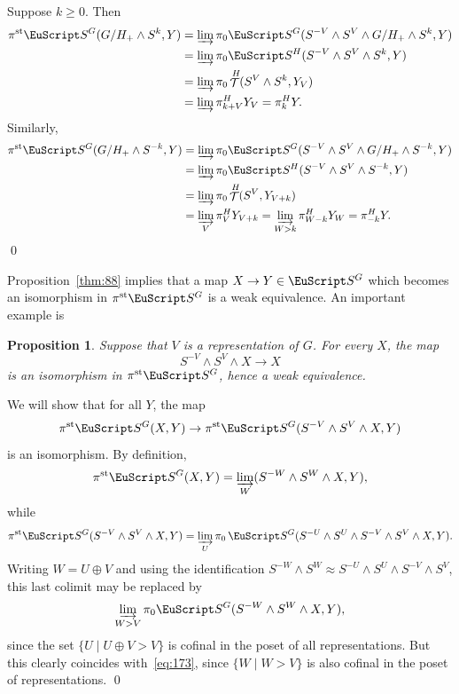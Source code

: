 \documentclass{amsart}
\newtheorem{prop}[equation]{Proposition}
\theoremstyle{definition}
\theoremstyle{remark}
\newenvironment{pf}{\bigskip{\em Proof:\/}}{\qed\medskip}
\newcommand{\spectra}{\EuScript S}
\DeclareMathOperator{\spaces}{\mathcal T}
\newcommand{\ugspaces}[1]{\spaces^{#1}}
\newcommand{\ugspectra}[1]{\spectra^{#1}}
\newcommand{\pist}{\pi^{\text{st}}}
\begin{document}
\begin{pf}
Suppose $k\ge 0$.   Then
\begin{align*}
\pist\ugspectra{G}(G/H_{+}\wedge S^{k},Y) &= \varinjlim \pi_{0}\ugspectra{G}(S^{-V}\wedge
S^{V}\wedge G/H_{+}\wedge S^{k},Y) \\
& = \varinjlim \pi_{0}\ugspectra{H}(S^{-V}\wedge
S^{V}\wedge S^{k},Y) \\
&= \varinjlim \pi_{0}\ugspaces{H}(S^{V}\wedge S^{k},Y_{V}) \\
& = \varinjlim \pi^{H}_{k+V}Y_{V}
=\pi^{H}_{k}Y.
\end{align*}
Similarly, 
\begin{align*}
\pist\ugspectra{G}(G/H_{+}\wedge S^{-k},Y) &= \varinjlim \pi_{0}\ugspectra{G}(S^{-V}\wedge
S^{V}\wedge G/H_{+}\wedge S^{-k},Y) \\
& = \varinjlim \pi_{0}\ugspectra{H}(S^{-V}\wedge
S^{V}\wedge S^{-k},Y) \\
&= \varinjlim \pi_{0}\ugspaces{H}(S^{V},Y_{V+k}) \\
& = \varinjlim_{V} \pi^{H}_{V}Y_{V+k}
 = \varinjlim_{W>k} \pi^{H}_{W-k}Y_{W}
 = \pi^{H}_{-k}Y.
\end{align*}
\end{pf}

Proposition~\ref{thm:88} implies that a map $X\to Y\in\ugspectra{G}$
which becomes an isomorphism in $\pist\ugspectra{G}$ is a weak
equivalence.  An important example is

\begin{prop}
\label{thm:159}
Suppose that $V$ is a representation of $G$.   For every $X$, the map 
\begin{equation}
\label{eq:163}
S^{-V}\wedge S^{V}\wedge X\to X
\end{equation}
is an isomorphism in $\pist\ugspectra{G}$, hence a weak equivalence.
\end{prop}

\begin{pf}
We will show that for all $Y$, the map 
\[
\pist\ugspectra{G}(X,Y) \to
\pist\ugspectra{G}(S^{-V}\wedge S^{V}\wedge X,Y)
\]
is an isomorphism.   By definition,
\begin{equation}
\label{eq:173}
\pist\ugspectra{G}(X,Y) = \varinjlim_{W}(S^{-W}\wedge S^{W}\wedge X,Y),
\end{equation}
while 
\[
\pist\ugspectra{G}(S^{-V}\wedge S^{V}\wedge X,Y) =
\varinjlim_{U}\pi_{0}\,\ugspectra{G}(S^{-U}\wedge S^{U}\wedge S^{-V}\wedge S^{V}\wedge X,Y).
\]
Writing $W=U\oplus V$ and using the identification $S^{-W}\wedge
S^{W}\approx S^{-U}\wedge S^{U}\wedge S^{-V}\wedge S^{V}$, this last
colimit may be replaced by
\[
\varinjlim_{W>V}\pi_{0}\ugspectra{G}(S^{-W}\wedge S^{W}\wedge X,Y),
\]
since the set $\{U\mid U\oplus V >V \}$ is cofinal in the poset of all
representations.  But this clearly coincides with~\eqref{eq:173},
since $\{W\mid W>V \}$ is also cofinal in the poset of
representations.
\end{pf}
\end{document}

